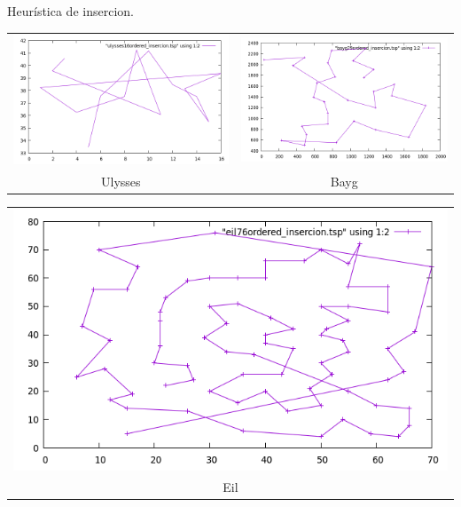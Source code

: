 \documentclass[10pt, xcolor=table]{beamer}
\begin{document}
\begin{frame}[fragile]{Heurística de insercion. }
\begin{center}
\begin{tabular}{cc}
\includegraphics[scale=0.23]{./Images/ulysses_insercion.png}
&
\includegraphics[scale=0.23]{./Images/bayg_insercion.png} \\
Ulysses & Bayg
\end{tabular}
\end{center}
\begin{center}
\begin{tabular}{c}
\includegraphics[scale=0.23]{./Images/eil_insercion.png} \\
Eil
\end{tabular}
\end{center}
\end{frame}
\end{document}
